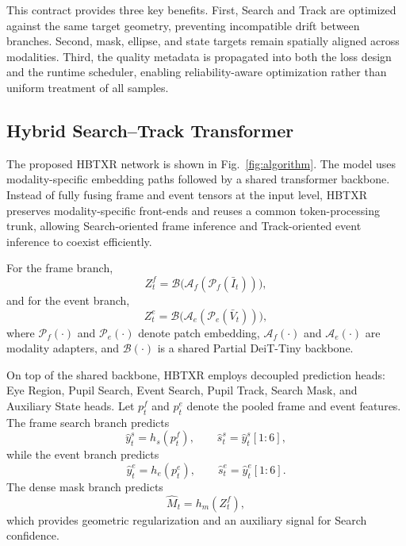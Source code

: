 \documentclass[journal]{IEEEtran}
\begin{document}
This contract provides three key benefits. First, Search and Track are optimized against the same target geometry, preventing incompatible drift between branches. Second, mask, ellipse, and state targets remain spatially aligned across modalities. Third, the quality metadata is propagated into both the loss design and the runtime scheduler, enabling reliability-aware optimization rather than uniform treatment of all samples.

\subsection{Hybrid Search--Track Transformer}
The proposed HBTXR network is shown in Fig.~\ref{fig:algorithm}. The model uses modality-specific embedding paths followed by a shared transformer backbone. Instead of fully fusing frame and event tensors at the input level, HBTXR preserves modality-specific front-ends and reuses a common token-processing trunk, allowing Search-oriented frame inference and Track-oriented event inference to coexist efficiently.

For the frame branch,
\begin{equation}
Z_t^f = \mathcal{B}\big(\mathcal{A}_f(\mathcal{P}_f(\bar I_t))\big),
\end{equation}
and for the event branch,
\begin{equation}
Z_t^e = \mathcal{B}\big(\mathcal{A}_e(\mathcal{P}_e(\bar V_t))\big),
\end{equation}
where $\mathcal{P}_f(\cdot)$ and $\mathcal{P}_e(\cdot)$ denote patch embedding, $\mathcal{A}_f(\cdot)$ and $\mathcal{A}_e(\cdot)$ are modality adapters, and $\mathcal{B}(\cdot)$ is a shared Partial DeiT-Tiny backbone.

On top of the shared backbone, HBTXR employs decoupled prediction heads: Eye Region, Pupil Search, Event Search, Pupil Track, Search Mask, and Auxiliary State heads. Let $p_t^f$ and $p_t^e$ denote the pooled frame and event features. The frame search branch predicts
\begin{equation}
\hat y_t^s = h_s(p_t^f), \qquad \hat s_t^s = \hat y_t^s[1{:}6],
\end{equation}
while the event branch predicts
\begin{equation}
\hat y_t^e = h_e(p_t^e), \qquad \hat s_t^e = \hat y_t^e[1{:}6].
\end{equation}
The dense mask branch predicts
\begin{equation}
\hat M_t = h_m(Z_t^f),
\end{equation}
which provides geometric regularization and an auxiliary signal for Search confidence.
\end{document}
